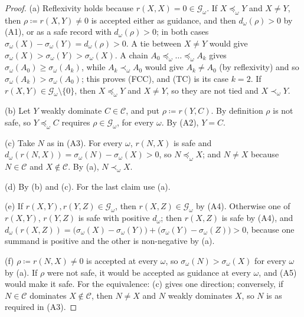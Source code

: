 \documentclass[11pt]{article}
\newcommand{\CC}{\mathcal{C}}
\theoremstyle{plain}
\theoremstyle{definition}
\theoremstyle{remark}
\begin{document}
\begin{proof}
(a) Reflexivity holds because $r(X,X)=0\in\mathcal G_\omega$. If $X\preceq_\omega Y$ and
$X\ne Y$, then $\rho\coloneqq r(X,Y)\ne0$ is accepted either as guidance, and then
$d_\omega(\rho)>0$ by (A1), or as a safe record with $d_\omega(\rho)>0$; in both cases
$\sigma_\omega(X)-\sigma_\omega(Y)=d_\omega(\rho)>0$. A tie between $X\ne Y$ would give
$\sigma_\omega(X)>\sigma_\omega(Y)>\sigma_\omega(X)$. A chain $A_0\preceq_\omega\dots
\preceq_\omega A_k$ gives $\sigma_\omega(A_0)\ge\sigma_\omega(A_k)$, while $A_k
\prec_\omega A_0$ would give $A_k\ne A_0$ (by reflexivity) and so $\sigma_\omega(A_k)>
\sigma_\omega(A_0)$; this proves (FCC), and (TC) is its case $k=2$. If $r(X,Y)\in
\mathcal G_\omega\setminus\{0\}$, then $X\preceq_\omega Y$ and $X\ne Y$, so they are not
tied and $X\prec_\omega Y$.

(b) Let $Y$ weakly dominate $C\in\CC$, and put $\rho\coloneqq r(Y,C)$. By definition
$\rho$ is not safe, so $Y\preceq_\omega C$ requires $\rho\in\mathcal G_\omega$, for every
$\omega$. By (A2), $Y=C$.

(c) Take $N$ as in (A3). For every $\omega$, $r(N,X)$ is safe and $d_\omega(r(N,X))=
\sigma_\omega(N)-\sigma_\omega(X)>0$, so $N\preceq_\omega X$; and $N\ne X$ because
$N\in\CC$ and $X\notin\CC$. By (a), $N\prec_\omega X$.

(d) By (b) and (c). For the last claim use (a).

(e) If $r(X,Y),r(Y,Z)\in\mathcal G_\omega$, then $r(X,Z)\in\mathcal G_\omega$ by (A4).
Otherwise one of $r(X,Y)$, $r(Y,Z)$ is safe with positive $d_\omega$; then $r(X,Z)$ is
safe by (A4), and $d_\omega(r(X,Z))=\bigl(\sigma_\omega(X)-\sigma_\omega(Y)\bigr)+
\bigl(\sigma_\omega(Y)-\sigma_\omega(Z)\bigr)>0$, because one summand is positive and the
other is non-negative by (a).

(f) $\rho\coloneqq r(N,X)\ne0$ is accepted at every $\omega$, so $\sigma_\omega(N)>
\sigma_\omega(X)$ for every $\omega$ by (a). If $\rho$ were not safe, it would be accepted
as guidance at every $\omega$, and (A5) would make it safe. For the equivalence: (c) gives
one direction; conversely, if $N\in\CC$ dominates $X\notin\CC$, then $N\ne X$ and $N$
weakly dominates $X$, so $N$ is as required in (A3).
\end{proof}
\end{document}
